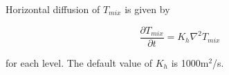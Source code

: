 Horizontal diffusion of $T_{mix}$ is given by

\begin{equation}
\frac{\partial T_{mix}}{\partial t} = K_h {\nabla}^2 T_{mix} 
\end{equation}

for each level. The default value of $K_h$ is 1000m$^2$/s.


































































